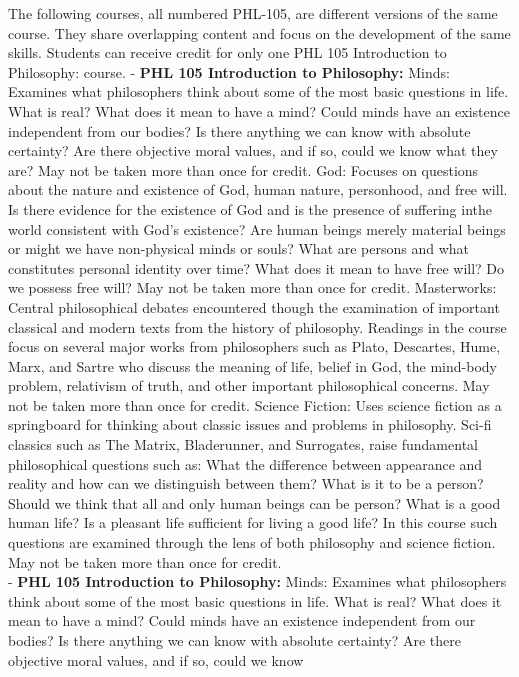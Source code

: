 \documentclass[
  letterpaper,
]{scrbook}
\begin{document}
The following courses, all numbered PHL-105, are different versions of
the same course. They share overlapping content and focus on the
development of the same skills. Students can receive credit for only one
PHL 105 Introduction to Philosophy: course. - \textbf{PHL 105
Introduction to Philosophy:} Minds: Examines what philosophers think
about some of the most basic questions in life. What is real? What does
it mean to have a mind? Could minds have an existence independent from
our bodies? Is there anything we can know with absolute certainty? Are
there objective moral values, and if so, could we know what they are?
May not be taken more than once for credit. God: Focuses on questions
about the nature and existence of God, human nature, personhood, and
free will. Is there evidence for the existence of God and is the
presence of suffering inthe world consistent with God's existence? Are
human beings merely material beings or might we have non-physical minds
or souls? What are persons and what constitutes personal identity over
time? What does it mean to have free will? Do we possess free will? May
not be taken more than once for credit. Masterworks: Central
philosophical debates encountered though the examination of important
classical and modern texts from the history of philosophy. Readings in
the course focus on several major works from philosophers such as Plato,
Descartes, Hume, Marx, and Sartre who discuss the meaning of life,
belief in God, the mind-body problem, relativism of truth, and other
important philosophical concerns. May not be taken more than once for
credit. Science Fiction: Uses science fiction as a springboard for
thinking about classic issues and problems in philosophy. Sci-fi
classics such as The Matrix, Bladerunner, and Surrogates, raise
fundamental philosophical questions such as: What the difference between
appearance and reality and how can we distinguish between them? What is
it to be a person? Should we think that all and only human beings can be
person? What is a good human life? Is a pleasant life sufficient for
living a good life? In this course such questions are examined through
the lens of both philosophy and science fiction. May not be taken more
than once for credit.\\
- \textbf{PHL 105 Introduction to Philosophy:} Minds: Examines what
philosophers think about some of the most basic questions in life. What
is real? What does it mean to have a mind? Could minds have an existence
independent from our bodies? Is there anything we can know with absolute
certainty? Are there objective moral values, and if so, could we know
\end{document}
